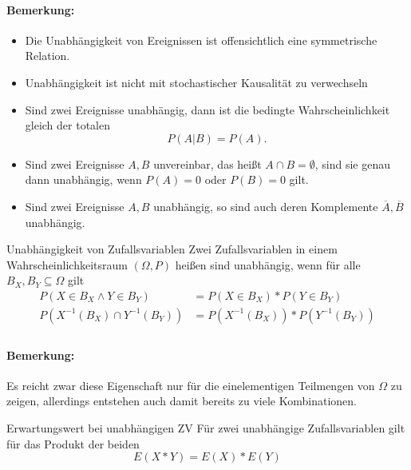 \paragraph{Bemerkung:}
\begin{itemize}
	\item Die Unabhängigkeit von Ereignissen ist offensichtlich eine symmetrische Relation.
	\item Unabhängigkeit ist nicht mit stochastischer Kausalität zu verwechseln
	\item Sind zwei Ereignisse unabhängig, dann ist die bedingte Wahrscheinlichkeit gleich der totalen
	\begin{equation*}
		P(A|B)=P(A).
	\end{equation*}
	\item Sind zwei Ereignisse $A,B$ unvereinbar, das heißt $A\cap B=\emptyset$, sind sie genau dann unabhängig, wenn $P(A)=0$ oder $P(B)=0$ gilt.
	\item Sind zwei Ereignisse $A,B$ unabhängig, so sind auch deren Komplemente $\overline A, \overline B$ unabhängig.
\end{itemize}


\begin{definition}{Unabhängigkeit von Zufallsvariablen}
	Zwei Zufallsvariablen in einem Wahrscheinlichkeitsraum $(\Omega,P)$ heißen sind unabhängig, wenn 
	für alle $B_X,B_Y\subseteq \Omega$ gilt
	\begin{align*}
		P(X\in B_X\wedge Y\in B_Y)&=P(X\in B_X)*P(Y\in B_Y)\\
		P(X^{-1}(B_X)\cap Y^{-1}(B_Y))&=P(X^{-1}(B_X))*P(Y^{-1}(B_Y))\\
	\end{align*}
\end{definition}
\paragraph{Bemerkung:}
Es reicht zwar diese Eigenschaft nur für die einelementigen Teilmengen von $\Omega$ zu zeigen, allerdings entstehen auch damit bereits zu viele Kombinationen.


\begin{satz}{Erwartungswert bei unabhängigen ZV}
	Für zwei unabhängige Zufallsvariablen gilt für das Produkt der beiden
	\begin{equation*}
		E(X*Y)=E(X)*E(Y)
	\end{equation*}
\end{satz}
